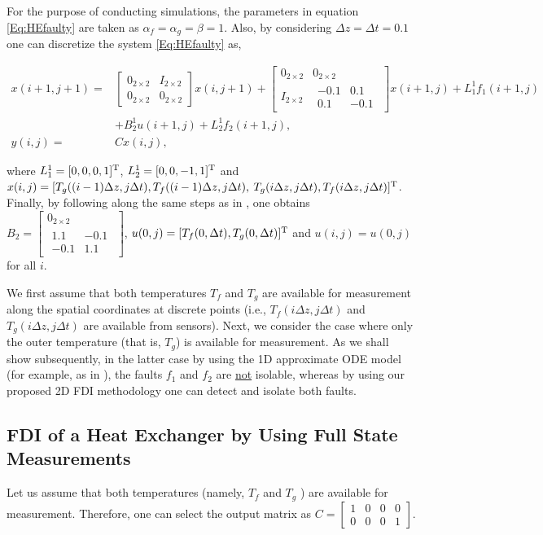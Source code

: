 \documentclass[journal,12pt,draftcls,onecolumn]{IEEEtran}
\newcommand{\tran}{\mathrm{T}}
\newcommand{\bsm}{\begin{smallmatrix}}
\newcommand{\esm}{\end{smallmatrix}}
\newcommand{\bbm}{\begin{bmatrix}}
\newcommand{\ebm}{\end{bmatrix}}
\newcommand{\bs}{\begin{small}}
\newcommand{\es}{\end{small}}
\begin{document}
For the purpose of conducting simulations, the parameters in equation \eqref{Eq:HEfaulty} are taken as $\alpha_f=\alpha_g=\beta=1$. Also, by considering $\Delta z=\Delta t=0.1$ one can discretize the system \eqref{Eq:HEfaulty} as,
\bs
\begin{equation}\label{Eq:FMIISimComplete}
\begin{split}
x(i+1,j+1) = &\bbm 0_{2\times2}  &I_{2\times2}\\ 0_{2\times2} &0_{2\times2}\ebm x(i,j+1) +
\bbm 0_{2\times2} &0_{2\times2}\\
I_{2\times2} &\bsm -0.1 &0.1\\0.1 &-0.1\esm
\ebm x(i+1,j)+ L_{1}^1 f_1(i+1,j)\\&+ B_2^1 u(i+1,j) + L_{2}^1 f_2(i+1,j),\\
y(i,j) = &Cx(i,j),
\end{split}
\end{equation}\es
where $\bs L_{1}^1 = [0,0,0,1]^\tran\es$, $\bs L_{2}^1=[0,0,-1,1]^\tran\es$ and $\bs x(i,j) = [T_g((i-1)\Delta z,j \Delta t), T_f((i-1)\Delta z,j \Delta t),\es$
$ \bs T_g(i\Delta z,j \Delta t), T_f(i\Delta z,j \Delta t)]^\tran\es$. Finally, by following along the same steps as in \cite{ACC2013}, one obtains $B_2 = \bbm 0_{2\times2} \\  \bsm 1.1 &-0.1 \\ -0.1 &1.1\esm\ebm$, $\bs u(0,j) =[T_f(0, \Delta t),T_g(0, \Delta t)]^\tran\es$ and $u(i,j)=u(0,j)$ for all $i$.

We first assume that both temperatures $T_f$ and $T_g$ are available for measurement along the spatial coordinates at discrete points (i.e., $T_f(i\Delta z,j\Delta t)$ and $T_g(i\Delta z,j\Delta t)$ are available from sensors). Next, we consider the case where only the outer temperature (that is, $T_g$) is available for measurement. As we shall show subsequently, in the latter case by using the 1D approximate ODE model (for example, as in \cite{BoundaryControl_1DApp}), the faults $f_1$ and $f_2$ are \underline{not} isolable, whereas by using our proposed 2D FDI  methodology one can detect and isolate  both faults.
\subsection{FDI of a Heat Exchanger by Using Full State Measurements}
Let us assume that both temperatures (namely, $T_f$ and $T_g$ ) are available for measurement. Therefore, one can select the output matrix as $C = \bbm 1 &0 &0 &0\\ 0 &0 &0 &1\ebm$.
\end{document}
